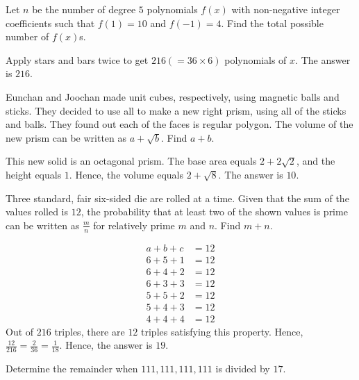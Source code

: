 \begin{problem}
Let $n$ be the number of degree $5$ polynomials $f(x)$ with non-negative integer coefficients such that $f(1)=10$ and $f(-1)=4$. Find the total possible number of $f(x)$s.
\end{problem}

\begin{solution}
Apply stars and bars twice to get $216(=36\times6)$ polynomials of $x$. The answer is $216$.
\end{solution}

\begin{problem}
Eunchan and Joochan made unit cubes, respectively, using magnetic balls and sticks. They decided to use all to make a new right prism, using all of the sticks and balls. They found out each of the faces is regular polygon. The volume of the new prism can be written as $a+\sqrt{b}$. Find $a+b$.
\end{problem}

\begin{solution}
This new solid is an octagonal prism. The base area equals $2+2\sqrt{2}$, and the height equals $1$. Hence, the volume equals $2+\sqrt{8}$. The answer is $10$.
\end{solution}

\begin{problem}
Three standard, fair six-sided die are rolled at a time. Given that the sum of the values rolled is $12$, the probability that at least two of the shown values is prime can be written as $\frac{m}{n}$ for relatively prime $m$ and $n$. Find $m+n$.
\end{problem}


\begin{solution}
\begin{align*}
a+b+c&=12\\
6+5+1&=12\\ 
6+4+2&=12\\
6+3+3&=12\\ 
5+5+2&=12\\ 
5+4+3&=12\\ 
4+4+4&=12
\end{align*}
Out of $216$ triples, there are $12$ triples satisfying this property. Hence, $\frac{12}{216}=\frac{2}{36}=\frac{1}{18}$. Hence, the answer is $19$.
\end{solution}

\begin{problem}
Determine the remainder when $111,111,111,111$ is divided by $17$.
\end{problem}

